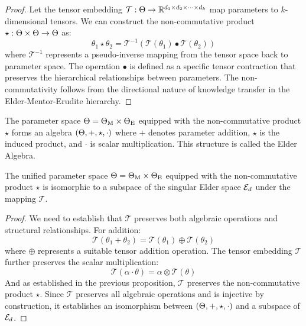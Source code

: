 \begin{proof}
Let the tensor embedding $\mathcal{T}: \Theta \rightarrow \mathbb{R}^{d_1 \times d_2 \times \cdots \times d_k}$ map parameters to $k$-dimensional tensors. We can construct the non-commutative product $\star: \Theta \times \Theta \rightarrow \Theta$ as:
\begin{equation}
\theta_1 \star \theta_2 = \mathcal{T}^{-1}(\mathcal{T}(\theta_1) \bullet \mathcal{T}(\theta_2))
\end{equation}
where $\mathcal{T}^{-1}$ represents a pseudo-inverse mapping from the tensor space back to parameter space. The operation $\bullet$ is defined as a specific tensor contraction that preserves the hierarchical relationships between parameters. The non-commutativity follows from the directional nature of knowledge transfer in the Elder-Mentor-Erudite hierarchy.
\end{proof}

\begin{definition}
The parameter space $\Theta = \Theta_{\text{M}} \times \Theta_{\text{E}}$ equipped with the non-commutative product $\star$ forms an algebra $(\Theta, +, \star, \cdot)$ where $+$ denotes parameter addition, $\star$ is the induced product, and $\cdot$ is scalar multiplication. This structure is called the Elder Algebra.
\end{definition}

\begin{theorem}
The unified parameter space $\Theta = \Theta_{\text{M}} \times \Theta_{\text{E}}$ equipped with the non-commutative product $\star$ is isomorphic to a subspace of the singular Elder space $\mathcal{E}_{d}$ under the mapping $\mathcal{T}$.
\end{theorem}

\begin{proof}
We need to establish that $\mathcal{T}$ preserves both algebraic operations and structural relationships. For addition:
\begin{equation}
\mathcal{T}(\theta_1 + \theta_2) = \mathcal{T}(\theta_1) \oplus \mathcal{T}(\theta_2)
\end{equation}
where $\oplus$ represents a suitable tensor addition operation. The tensor embedding $\mathcal{T}$ further preserves the scalar multiplication:
\begin{equation}
\mathcal{T}(\alpha \cdot \theta) = \alpha \otimes \mathcal{T}(\theta)
\end{equation}
And as established in the previous proposition, $\mathcal{T}$ preserves the non-commutative product $\star$. Since $\mathcal{T}$ preserves all algebraic operations and is injective by construction, it establishes an isomorphism between $(\Theta, +, \star, \cdot)$ and a subspace of $\mathcal{E}_{d}$.
\end{proof}

